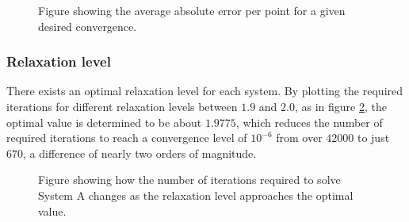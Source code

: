 \begin{figure}[h!]
\centering
\setlength\fboxsep{0pt}
\setlength\fboxrule{0.5pt}
\label{fig:convergence_accuracy}
\caption{Figure showing the average absolute error per point for a given desired convergence.}
\end{figure}

\subsubsection{Relaxation level}
There exists an optimal relaxation level for each system. By plotting the required iterations for different relaxation levels between $1.9$ and $2.0$, as in figure \ref{fig:relax_narrow}, the optimal value is determined to be about $1.9775$, which reduces the number of required iterations to reach a convergence level of $10^{-6}$ from over $42000$ to just $670$, a difference of nearly two orders of magnitude. 

\begin{figure}[h!]
\centering
\setlength\fboxsep{0pt}
\setlength\fboxrule{0.5pt}
\label{fig:relax_narrow}
\caption{Figure showing how the number of iterations required to solve System A changes as the relaxation level approaches the optimal value.}
\end{figure}

